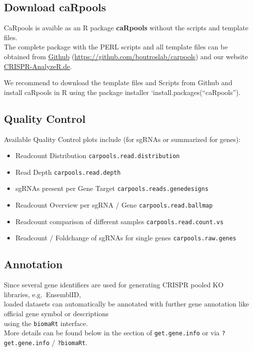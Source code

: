 \documentclass[]{article}
\providecommand{\tightlist}{%
  \setlength{\itemsep}{0pt}\setlength{\parskip}{0pt}}
\begin{document}
\newpage

\subsection{Download caRpools}\label{download-carpools}

CaRpools is avaible as an R package \textbf{caRpools} without the
scripts and template files.\\
The complete package with the PERL scripts and all template files can be
obtained from \href{https://github.com/boutroslab/carpools}{Github}
(\url{https://github.com/boutroslab/carpools}) and our website
\href{http://www.crispr-analyzer.de}{CRISPR-AnalyzeR.de}.

We recommend to download the template files and Scripts from Github and
install caRpools in R using the package installer
`install.packages(``caRpools'').

\subsection{Quality Control}\label{quality-control}

Available Quality Control plots include (for sgRNAs or summarized for
genes):

\begin{itemize}
\tightlist
\item
  Readcount Distribution \texttt{carpools.read.distribution}
\item
  Read Depth \texttt{carpools.read.depth}
\item
  sgRNAs present per Gene Target \texttt{carpools.reads.genedesigns}
\item
  Readcount Overview per sgRNA / Gene \texttt{carpools.read.ballmap}
\item
  Readcount comparison of different samples
  \texttt{carpools.read.count.vs}
\item
  Readcount / Foldchange of sgRNAs for single genes
  \texttt{carpools.raw.genes}
\end{itemize}

\subsection{Annotation}\label{annotation}

Since several gene identifiers are used for generating CRISPR pooled KO
libraries, e.g.~EnsemblID,\\
loaded datasets can automatically be annotated with further gene
annotation like official gene symbol or descriptions\\
using the \texttt{biomaRt} interface.\\
More details can be found below in the section of \texttt{get.gene.info}
or via \texttt{?get.gene.info} / \texttt{?biomaRt}.
\end{document}
